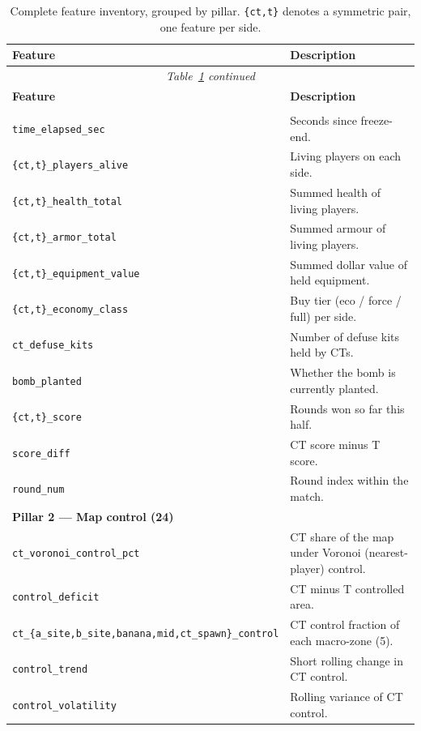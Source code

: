 \documentclass[11pt,a4paper]{article}
\begin{document}
{\small
\begin{longtable}{p{}p{}}
\caption{Complete feature inventory, grouped by pillar. \texttt{\{ct,t\}} denotes a symmetric pair,
one feature per side.}\label{tab:features}\\
\toprule
\textbf{Feature} & \textbf{Description} \\
\midrule
\endfirsthead
\multicolumn{2}{c}{\textit{Table~\ref{tab:features} continued}}\\
\toprule \textbf{Feature} & \textbf{Description} \\ \midrule
\endhead
\bottomrule
\endfoot
\multicolumn{2}{l}{\textbf{Pillar 1 — Economy \& combat state (17)}}\\
\midrule
\texttt{time\_elapsed\_sec} & Seconds since freeze-end. \\
\texttt{\{ct,t\}\_players\_alive} & Living players on each side. \\
\texttt{\{ct,t\}\_health\_total} & Summed health of living players. \\
\texttt{\{ct,t\}\_armor\_total} & Summed armour of living players. \\
\texttt{\{ct,t\}\_equipment\_value} & Summed dollar value of held equipment. \\
\texttt{\{ct,t\}\_economy\_class} & Buy tier (eco / force / full) per side. \\
\texttt{ct\_defuse\_kits} & Number of defuse kits held by CTs. \\
\texttt{bomb\_planted} & Whether the bomb is currently planted. \\
\texttt{\{ct,t\}\_score} & Rounds won so far this half. \\
\texttt{score\_diff} & CT score minus T score. \\
\texttt{round\_num} & Round index within the match. \\
\midrule
\multicolumn{2}{l}{\textbf{Pillar 2 — Map control (24)}}\\
\midrule
\texttt{ct\_voronoi\_control\_pct} & CT share of the map under Voronoi (nearest-player) control. \\
\texttt{control\_deficit} & CT minus T controlled area. \\
\texttt{ct\_\{a\_site,b\_site,banana,mid,ct\_spawn\}\_control} & CT control fraction of each macro-zone (5). \\
\texttt{control\_trend} & Short rolling change in CT control. \\
\texttt{control\_volatility} & Rolling variance of CT control. \\

\end{longtable}}
\end{document}
